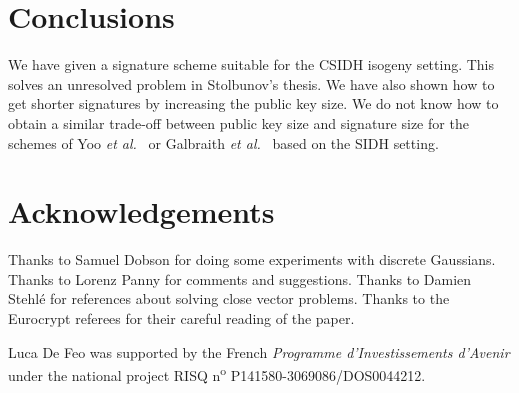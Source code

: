 \documentclass{llncs}
\begin{document}
\section{Conclusions}


We have given a signature scheme suitable for the CSIDH isogeny setting.
This solves an unresolved problem in Stolbunov's thesis.
We have also shown how to get shorter signatures by increasing the public key size.
We do not know how to obtain a similar trade-off between public key size and signature size for the schemes of Yoo \emph{et al.}~\cite{YAJJS17} or Galbraith \emph{et al.}~\cite{GPS17} based on the SIDH setting.


\section*{Acknowledgements}

Thanks to Samuel Dobson for doing some experiments with discrete Gaussians.
 Thanks to Lorenz Panny for comments and suggestions.
Thanks to Damien Stehl{\'{e}} for references about solving close vector problems.
Thanks to the Eurocrypt referees for their careful reading of the paper.


Luca De Feo was supported by the French \emph{Programme
  d'Investissements d'Avenir} under the national project RISQ
n\textsuperscript{o} P141580-3069086/DOS0044212.





\end{document}
